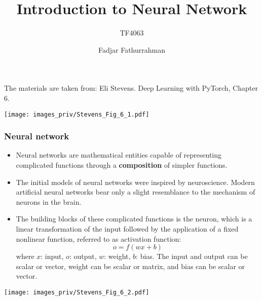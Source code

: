 \documentclass[english,10pt,aspectratio=169,fleqn]{beamer}
\begin{document}
\title{Introduction to Neural Network}
\subtitle{TF4063}
\author{Fadjar Fathurrahman}
\date{}


\frame{\titlepage}


\begin{frame} %

The materials are taken from:
Eli Stevens. Deep Learning with PyTorch, Chapter 6.

\end{frame} %


\begin{frame}[plain] %

{\centering
\texttt{[image: images\_priv/Stevens\_Fig\_6\_1.pdf]}
\par}

\end{frame} %


\begin{frame}
\frametitle{Neural network}

\begin{itemize}
\item Neural networks are mathematical entities capable of representing complicated functions
through a \textbf{composition} of simpler functions.
\item The initial models of neural networks were inspired by neuroscience. Modern artificial
neural networks bear only a slight resemblance to the mechanism of neurons in the brain.
\item The building blocks of these complicated functions is the neuron, which is a linear
transformation of the input followed by the application of a fixed nonlinear function, referred
to as activation function:
\begin{equation*}
o = f(wx + b)
\end{equation*}
where $x$: input, $o$: output, $w$: weight, $b$: bias. The input and output can be scalar or
vector, weight can be scalar or matrix, and bias can be scalar or vector.
\end{itemize}

\end{frame}


\begin{frame} %

{\centering
\texttt{[image: images\_priv/Stevens\_Fig\_6\_2.pdf]}
\par}

\end{frame}
\end{document}

